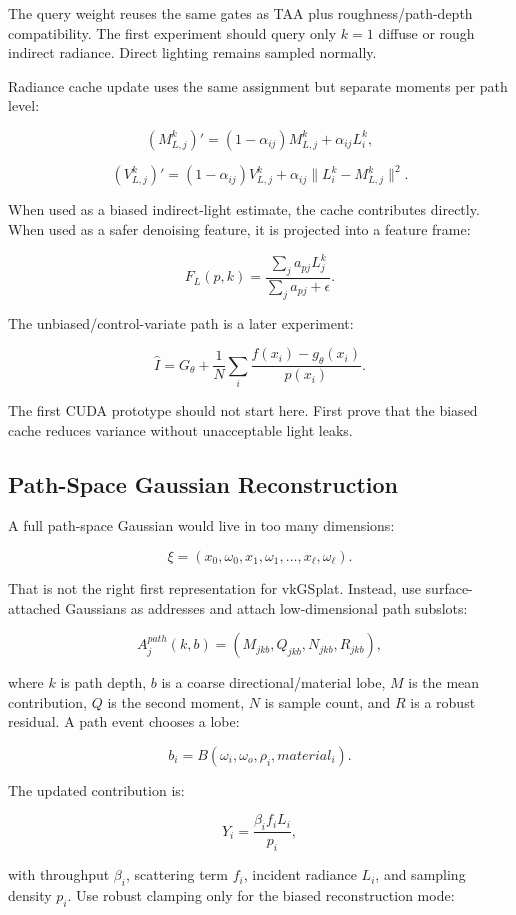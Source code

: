 \documentclass[11pt]{article}
\begin{document}
The query weight reuses the same gates as TAA plus roughness/path-depth
compatibility. The first experiment should query only $k=1$ diffuse or rough
indirect radiance. Direct lighting remains sampled normally.

Radiance cache update uses the same assignment but separate moments per path
level:

\[
  (M_{L,j}^k)' =
  (1-\alpha_{ij})M_{L,j}^k
  + \alpha_{ij}L_i^k,
\]

\[
  (V_{L,j}^k)' =
  (1-\alpha_{ij})V_{L,j}^k
  + \alpha_{ij}\|L_i^k - M_{L,j}^k\|^2.
\]

When used as a biased indirect-light estimate, the cache contributes directly.
When used as a safer denoising feature, it is projected into a feature frame:

\[
  F_L(p,k) =
  \frac{\sum_j a_{pj}L_j^k}{\sum_j a_{pj}+\epsilon}.
\]

The unbiased/control-variate path is a later experiment:

\[
  \hat{I} =
  G_\theta +
  \frac{1}{N}\sum_i \frac{f(x_i)-g_\theta(x_i)}{p(x_i)}.
\]

The first CUDA prototype should not start here. First prove that the biased
cache reduces variance without unacceptable light leaks.

\subsection{Path-Space Gaussian Reconstruction}

A full path-space Gaussian would live in too many dimensions:

\[
  \xi =
  (x_0,\omega_0,x_1,\omega_1,\ldots,x_\ell,\omega_\ell).
\]

That is not the right first representation for vkGSplat. Instead, use
surface-attached Gaussians as addresses and attach low-dimensional path
subslots:

\[
  A_j^{path}(k,b) =
  (M_{jkb},Q_{jkb},N_{jkb},R_{jkb}),
\]

where $k$ is path depth, $b$ is a coarse directional/material lobe, $M$ is the
mean contribution, $Q$ is the second moment, $N$ is sample count, and $R$ is a
robust residual. A path event chooses a lobe:

\[
  b_i =
  B(\omega_i,\omega_o,\rho_i,material_i).
\]

The updated contribution is:

\[
  Y_i =
  \frac{\beta_i f_i L_i}{p_i},
\]

with throughput $\beta_i$, scattering term $f_i$, incident radiance $L_i$, and
sampling density $p_i$. Use robust clamping only for the biased reconstruction
mode:
\end{document}
